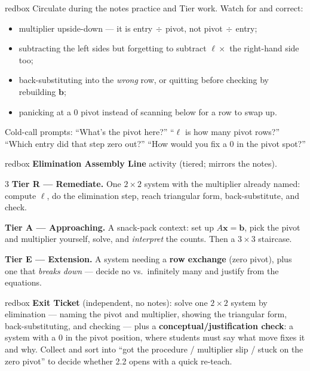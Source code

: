 \documentclass[10pt]{article}
\newcommand{\xx}{\mathbf{x}}
\newcommand{\bb}{\mathbf{b}}
\begin{document}
\begin{skillbox}{redbox}
Circulate during the notes practice and Tier work. Watch for and correct:
\begin{itemize}[leftmargin=1.2em, nosep]
  \item multiplier upside-down --- it is entry$\,\div\,$pivot, not pivot$\,\div\,$entry;
  \item subtracting the left sides but forgetting to subtract $\ell\times$ the right-hand side too;
  \item back-substituting into the \emph{wrong} row, or quitting before checking by rebuilding $\bb$;
  \item panicking at a $0$ pivot instead of scanning below for a row to swap up.
\end{itemize}
Cold-call prompts: ``What's the pivot here?'' ``$\ell$ is how many pivot rows?'' ``Which entry did
that step zero out?'' ``How would you fix a $0$ in the pivot spot?''
\end{skillbox}

\begin{skillbox}{redbox}
\textbf{Elimination Assembly Line} activity (tiered; mirrors the notes).
\begin{multicols}{3}
\textbf{Tier R --- Remediate.} One $2\times 2$ system with the multiplier already named: compute
$\ell$, do the elimination step, reach triangular form, back-substitute, and check.

\columnbreak
\textbf{Tier A --- Approaching.} A snack-pack context: set up $A\xx=\bb$, pick the pivot and
multiplier yourself, solve, and \emph{interpret} the counts. Then a $3\times 3$ staircase.

\columnbreak
\textbf{Tier E --- Extension.} A system needing a \textbf{row exchange} (zero pivot), plus one that
\emph{breaks down} --- decide no vs.\ infinitely many and justify from the equations.
\end{multicols}
\end{skillbox}

\begin{skillbox}{redbox}
\textbf{Exit Ticket} (independent, no notes): solve one $2\times 2$ system by elimination ---
naming the pivot and multiplier, showing the triangular form, back-substituting, and checking ---
plus a \textbf{conceptual/justification check}: a system with a $0$ in the pivot position, where
students must say what move fixes it and why. Collect and sort into ``got the procedure / multiplier
slip / stuck on the zero pivot'' to decide whether 2.2 opens with a quick re-teach.
\end{skillbox}
\end{document}
